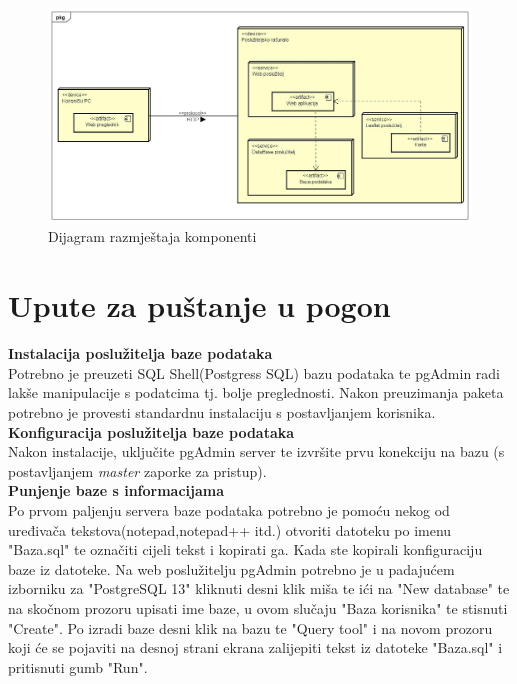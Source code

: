 			 \begin{figure}[h!]
			 	\centering
			 	\includegraphics[width=\linewidth]{./slike/Dijagram_razmjestaja.jpg}
			 	\caption{Dijagram razmještaja komponenti}
			 \end{figure}
			
			\eject 
		
		\section{Upute za puštanje u pogon}
		
			\textbf{Instalacija poslužitelja baze podataka}\\
		
			 {Potrebno je preuzeti SQL Shell(Postgress SQL) bazu podataka te pgAdmin radi lakše manipulacije s podatcima tj. bolje preglednosti. Nakon preuzimanja paketa potrebno je provesti standardnu instalaciju s postavljanjem korisnika.}\\
			 
			 \textbf{Konfiguracija poslužitelja baze podataka}\\
			 
			 {Nakon instalacije, uključite pgAdmin server te izvršite prvu konekciju na bazu (s postavljanjem \textit{master} zaporke za pristup).}\\
			 
			 \textbf{Punjenje baze s informacijama}\\
			 
			 {Po prvom paljenju servera baze podataka potrebno je pomoću nekog od uređivača tekstova(notepad,notepad++ itd.) otvoriti datoteku po imenu "Baza.sql" te označiti cijeli tekst i kopirati ga. Kada ste kopirali konfiguraciju baze iz datoteke. Na web poslužitelju pgAdmin potrebno je u padajućem izborniku za "PostgreSQL 13" kliknuti desni klik miša te ići na "New database" te na skočnom prozoru  upisati ime baze, u ovom slučaju "Baza korisnika" te stisnuti "Create". Po izradi baze desni klik na bazu te "Query tool" i na novom prozoru koji će se pojaviti na desnoj strani ekrana zalijepiti tekst iz datoteke "Baza.sql" i pritisnuti gumb "Run".}\\
			 
